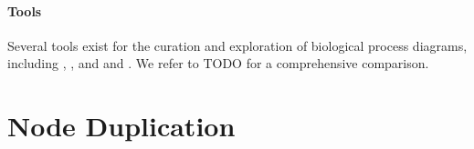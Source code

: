 \documentclass[
	fontsize=10pt, %
	twoside=false, %
	secnumdepth=1, %
  toc=indentunnumbered %
]{kaobook}
\begin{document}








\paragraph{Tools} Several tools exist for the curation and exploration of
biological process diagrams, including 
\cite{funahashi_CellDesignerVersatileModeling_2008}, 
\cite{gawron_MINERVAPlatformVisualization_2016}, and 
\cite{shannon_cytoscape_2003} and 
\cite{rohn_VANTEDV2Framework_2012}. We refer to TODO for a comprehensive
comparison.




\section{Node Duplication}
\end{document}
